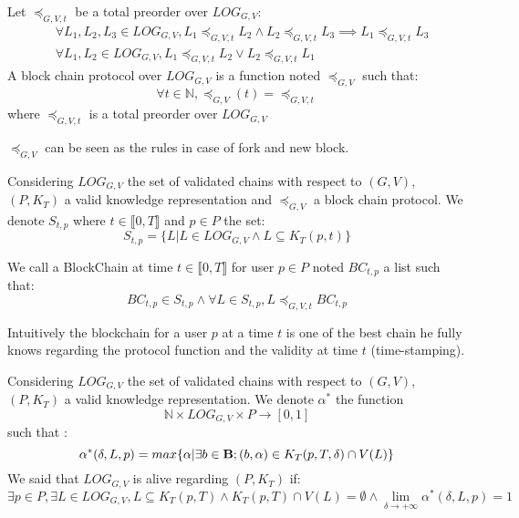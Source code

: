 \begin{mydef}
	Let $\preceq_{G,V,t}$ be  a total preorder over $LOG_{G,V}$:
\begin{eqnarray*}		
	&\forall L_1, L_2, L_3 \in LOG_{G,V}, L_1 \preceq_{G,V,t} L_2 \land L_2 \preceq_{G,V,t} L_3 \implies L_1 \preceq_{G,V,t} L_3  \\
	&\forall L_1, L_2 \in LOG_{G,V}, L_1 \preceq_{G,V,t} L_2 \lor L_2 \preceq_{G,V,t} L_1 
\end{eqnarray*}
	A block chain protocol over $LOG_{G,V}$ is a function noted $\preceq_{G,V}$ such that: $$ \forall t \in \mathbb{N}, \preceq_{G,V}(t) =  \preceq_{G,V,t}$$ where $\preceq_{G,V,t}$ is a total preorder over $LOG_{G,V}$
\end{mydef}
\begin{myrem}
	$\preceq_{G,V}$ can be seen as the rules in case of fork and new block. 
\end{myrem}

\begin{mydef}
	Considering $LOG_{G,V}$ the set of validated chains with respect to $(G,V)$, $(P,K_T)$ a valid knowledge representation and $\preceq_{G,V}$ a block chain protocol. We denote $S_{t,p}$ where $t\in \llbracket0,T\rrbracket$ and $p\in P$ the set:
	$$ S_{t,p} = \{L | L \in LOG_{G,V} \land  L \subseteq K_T(p,t)\} $$
	
	We call a BlockChain at time $t\in \llbracket0,T\rrbracket$ for user $p \in P$ noted $BC_{t,p}$ a list such that:
	$$BC_{t,p} \in S_{t,p} \land \forall L \in S_{t,p}, L \preceq_{G,V,t} BC_{t,p} $$
	
\end{mydef}
\begin{myrem}
	Intuitively the blockchain for a user $p$ at a time $t$ is one of the best chain he fully knows regarding the protocol function and the validity at time $t$ (time-stamping).
\end{myrem}

\begin{mydef}
	Considering $LOG_{G,V}$ the set of validated chains with respect to $(G,V)$, $(P,K_T)$ a valid knowledge representation.
	We denote $\alpha^*$ the function $$ \mathbb{N} \times LOG_{G,V} \times P \rightarrow [0,1]$$ such that : 
	$$\alpha^*(\delta,L,p) = max\{\alpha | \exists b \in \text{\bf B}; (b,\alpha) \in K_T(p,T,\delta)\cap V(L)\} $$
	We said that $LOG_{G,V}$ is alive regarding $(P,K_T)$ if:
	$$\exists p \in P, \exists L \in LOG_{G,V}, L \subseteq K_T(p,T) \land K_T(p,T) \cap V(L) = \emptyset \land \lim\limits_{\delta\rightarrow +\infty} \alpha^*(\delta,L,p) = 1$$
\end{mydef}




